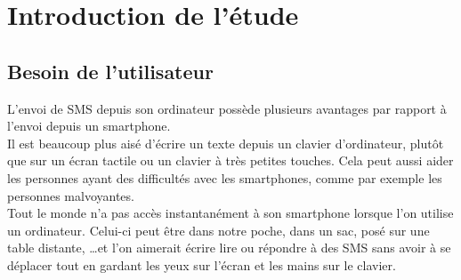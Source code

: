 \cleardoublepage



\chapter{Introduction de l'étude}
\label{Introduction de l'étude}


\section{Besoin de l'utilisateur}

L'envoi de SMS depuis son ordinateur possède plusieurs avantages par rapport à l'envoi depuis un smartphone.
\\


Il est beaucoup plus aisé d'écrire un texte depuis un clavier d'ordinateur, plutôt que sur un écran tactile ou un clavier à très petites touches.
Cela peut aussi aider les personnes ayant des difficultés avec les smartphones, comme par exemple les personnes malvoyantes.
\\


Tout le monde n'a pas accès instantanément à son smartphone lorsque l'on utilise un ordinateur.
Celui-ci peut être dans notre poche, dans un sac, posé sur une table distante, \ldots et l'on aimerait écrire lire ou répondre à des SMS sans avoir à se déplacer tout en gardant les yeux sur l'écran et les mains sur le clavier.






